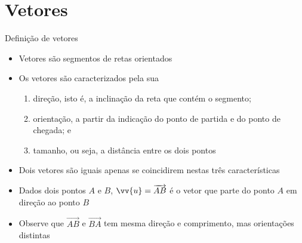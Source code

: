 \section{Vetores}

\begin{frame}[fragile]{Definição de vetores}

    \begin{itemize}
        \item Vetores são segmentos de retas orientados
        \pause

        \item Os vetores são caracterizados pela sua 

        \begin{enumerate}
            \item direção, isto é, a inclinação da reta que contém o segmento;
            \pause

            \item orientação, a partir da indicação do ponto de partida e do ponto de chegada; e
            \pause
        
            \item tamanho, ou seja, a distância entre os dois pontos
        \end{enumerate}
        \pause

        \item Dois vetores são iguais apenas se coincidirem nestas três características
        \pause

        \item Dados dois pontos $A$ e $B$, $\vv{u} = \overrightarrow{AB}$ é o vetor que parte do ponto $A$ em direção 
        ao ponto $B$ 
        \pause

        \item Observe que $\overrightarrow{AB}$ e $\overrightarrow{BA}$ tem mesma direção e comprimento, mas orientações distintas
    \end{itemize}

\end{frame}

